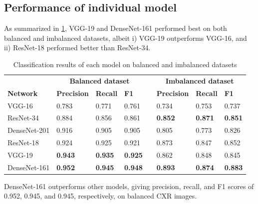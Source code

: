 \documentclass[conference]{IEEEtran}
\begin{document}
\subsection{Performance of individual model}
As summarized in \cref{Table:all_models}, VGG-19 and DenseNet-161 performed best on both balanced and imbalanced datasets, albeit %
i) VGG-19 outperforms VGG-16, and ii) %
ResNet-18 performed better than ResNet-34. %
\begin{table}
    \centering
	\caption{Classification results of each model on balanced and imbalanced datasets} 
	\label{Table:all_models}
	\scriptsize{
	\begin{tabular}{p{2.9cm}p{1.6cm}p{1.4cm}p{1.0cm}p{0.3cm}p{1.5cm}p{1.4cm}p{1.0cm}}
	 & \multicolumn{3}{c}{\bfseries{Balanced dataset}} && \multicolumn{3}{c}{\bfseries{Imbalanced dataset}} \\
		\cmidrule{2-4}\cmidrule{6-8}   
        \textbf{Network}& \textbf{Precision} & \textbf{Recall}& \textbf{F1} && \textbf{Precision} & \textbf{Recall}& \textbf{F1}\\
		\hline
		VGG-16 & 0.783 & 0.771 & 0.761 && 0.734 & 0.753 & 0.737\\
		ResNet-34 & 0.884 & 0.856 & 0.861 && \textbf{0.852} & \textbf{0.871} & \textbf{0.851} \\
		DenseNet-201  & 0.916 & 0.905 & 0.905 && 0.805 & 0.773 & 0.826\\		
		ResNet-18 & 0.924 & 0.925 & 0.921 && 0.873 & 0.847 & 0.852\\
		VGG-19 & \textbf{0.943} & \textbf{0.935} & \textbf{0.925} && 0.862 & 0.848 & 0.845\\
		DenseNet-161  & \textbf{0.952} & \textbf{0.945} & \textbf{0.948} && \textbf{0.893} & \textbf{0.874} & \textbf{0.883}\\
		\hline
	\end{tabular}}
	\vspace{-2mm} 
\end{table}
DenseNet-161 outperforms other models, giving precision, recall, and F1 scores of 0.952, 0.945, and 0.945, respectively, on balanced CXR images. %
\end{document}
